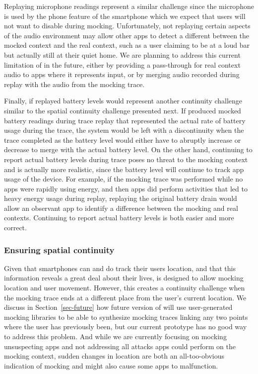 Replaying microphone readings represent a similar challenge since the
microphone is used by the phone feature of the smartphone which we expect
that users will not want to disable during mocking. Unfortunately, not
replaying certain aspects of the audio environment may allow other apps to
detect a different between the mocked context and the real context, such as a
user claiming to be at a loud bar but actually still at their quiet home. We
are planning to address this current limitation of \PocketMocker{} in the
future, either by providing a pass-through for real context audio to apps
where it represents input, or by merging audio recorded during replay with
the audio from the mocking trace.

Finally, if replayed battery levels would represent another continuity
challenge similar to the spatial continuity challenge presented next. If
\PocketMocker{} produced mocked battery readings during trace replay that
represented the actual rate of battery usage during the trace, the system
would be left with a discontinuity when the trace completed as the battery
level would either have to abruptly increase or decrease to merge with the
actual battery level. On the other hand, continuing to report actual battery
levels during trace poses no threat to the mocking context and is actually
more realistic, since the battery level will continue to track app usage of
the device. For example, if the mocking trace was performed while no apps
were rapidly using energy, and then apps did perform activities that led to
heavy energy usage during replay, replaying the original battery drain would
allow an observant app to identify a difference between the mocking and real
contexts. Continuing to report actual battery levels is both easier and more
correct.

\subsubsection{Ensuring spatial continuity}

Given that smartphones can and do track their users location, and that this
information reveals a great deal about their lives, \PocketMocker{} is
designed to allow mocking location and user movement. However, this creates a
continuity challenge when the mocking trace ends at a different place from
the user's current location. We discuss in Section~\ref{sec-future} how
future version of \PocketMocker{} will use user-generated mocking libraries
to be able to synthesize mocking traces linking any two points where the user
has previously been, but our current prototype has no good way to address
this problem. And while we are currently focusing on mocking unsuspecting
apps and not addressing all attacks apps could perform on the mocking
context, sudden changes in location are both an all-too-obvious indication of
mocking and might also cause some apps to malfunction.


